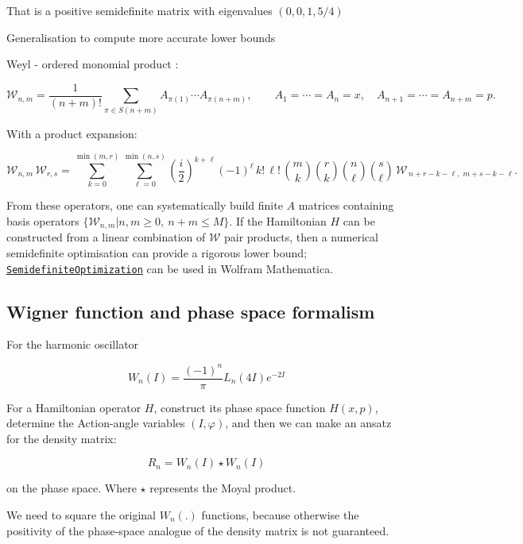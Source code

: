 \documentclass{article}
\theoremstyle{definition}
\begin{document}
That is a positive semidefinite matrix with eigenvalues $(0,0,1,5/4)$

Generalisation to compute more accurate lower bounds

Weyl - ordered monomial product \cite{paper:GelfandFairlie1991}:

\[
\mathcal{W}_{n,m}
=
\frac{1}{(n+m)!}
\sum_{\pi\in S(n+m)}
A_{\pi(1)}\cdots A_{\pi(n+m)},
\qquad
A_1=\cdots=A_n=x,\quad
A_{n+1}=\cdots=A_{n+m}=p.
\]

With a product expansion:

\[
\mathcal{W}_{n,m}\,\mathcal{W}_{r,s}
=
\sum_{k=0}^{\min(m,r)}
\sum_{\ell=0}^{\min(n,s)}
\left(\frac{i}{2}\right)^{k+\ell}
(-1)^{\ell}
\,k!\,\ell!\,
\binom{m}{k}\binom{r}{k}\binom{n}{\ell}\binom{s}{\ell}\,
\mathcal{W}_{\,n+r-k-\ell,\;m+s-k-\ell}.
\]


From these operators, one can systematically build finite $A$ matrices containing basis operators $\{ \mathcal{W}_{n,m} | n,m\ge 0, \ n+m \le M \}$. If the Hamiltonian $H$ can be constructed from a linear combination of $\mathcal{W}$ pair products, then a numerical semidefinite optimisation can provide a rigorous lower bound; \href{https://reference.wolfram.com/language/ref/SemidefiniteOptimization.html}{\tt SemidefiniteOptimization} can be used in Wolfram Mathematica.

\subsection{Wigner function and phase space formalism}

For the harmonic oscillator

\begin{equation}
    W_n(I) = \frac{(-1)^n}{\pi} L_n(4I) e^{-2 I}
\end{equation}

For a Hamiltonian operator $H$, construct its phase space function $H(x,p)$, determine the Action-angle variables $(I,\varphi)$, and then we can make an ansatz for the density matrix:

\begin{equation}
    R_n=W_n(I) \star W_n(I)
\end{equation}

on the phase space. Where $\star$ represents the Moyal product.

We need to square the original $W_n(.)$ functions, because otherwise the positivity of the phase-space analogue of the density matrix is not guaranteed.
\end{document}
